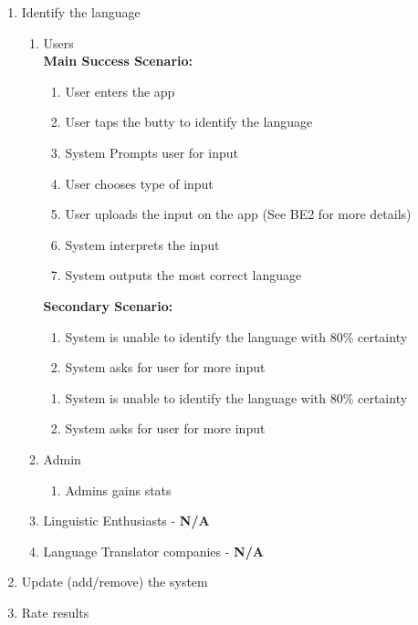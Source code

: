 \begin{enumerate}[{\bf BE1.}]



	\item Identify the language
		\begin{enumerate}[{\bf VP1.}]
			\item Users \\
				\textbf{Main Success Scenario:}
					\begin{enumerate}[{\bf 1.}]
						\item User enters the app
						\item User taps the butty to identify the language
							\item System Prompts user for input
							\item User chooses type of input
							\item User uploads the input on the app (See BE2 for more details)
							\item System interprets the input
							\item System outputs the most correct language
					\end{enumerate}
					\textbf{Secondary Scenario:}
					\begin{enumerate}[{\bf 7.i.}]
						\item System is unable to identify the language with 80\% certainty
						\item System asks for user for more input
					\end{enumerate} 
					\begin{enumerate}[{\bf 8.}]
						\item System is unable to identify the language with 80\% certainty
						\item System asks for user for more input
					\end{enumerate} 
			\item Admin
				\begin{enumerate}[resume]
					\item Admins gains stats
				\end{enumerate}
			\item Linguistic Enthusiasts - \textbf{N/A}
			\item Language Translator companies - \textbf{N/A}
		\end{enumerate}

	

	\item Update (add/remove) the system

	\item Rate results
\end{enumerate}


